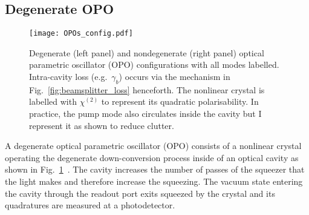\subsection{Degenerate OPO}

\begin{figure}
	\centering
	\texttt{[image: OPOs\_config.pdf]}
	\caption{Degenerate (left panel) and nondegenerate (right panel) optical parametric oscillator (OPO) configurations with all modes labelled. Intra-cavity loss (e.g.\ $\gamma_b$) occurs via the mechanism in Fig.~\ref{fig:beamsplitter_loss} henceforth. The nonlinear crystal is labelled with $\chi^{(2)}$ to represent its quadratic polarisability. In practice, the pump mode also circulates inside the cavity but I represent it as shown to reduce clutter.  %
	}
	\label{fig:OPOs_config}
\end{figure}

A degenerate optical parametric oscillator (OPO) consists of a nonlinear crystal operating the degenerate down-conversion process inside of an optical cavity as shown in Fig.~\ref{fig:OPOs_config}~\cite{PhysRevA.30.1386}. The cavity increases the number of passes of the squeezer that the light makes and therefore increase the squeezing. The vacuum state entering the cavity through the readout port exits squeezed by the crystal and its quadratures are measured at a photodetector.

